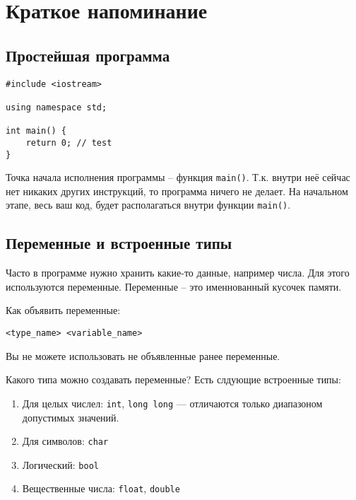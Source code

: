 \documentclass[10pt,a4paper]{article}
\begin{document}
\section*{Краткое напоминание}


\subsection*{Простейшая программа}

\begin{lstlisting}
#include <iostream>

using namespace std;

int main() {
    return 0; // test
}
\end{lstlisting}

Точка начала исполнения программы -- функция \lstinline|main()|. Т.к. внутри неё сейчас нет никаких других инструкций, то программа ничего не делает. На начальном этапе, весь ваш код, будет располагаться внутри функции \lstinline|main()|.

\subsection*{Переменные и встроенные типы}

Часто в программе нужно хранить какие-то данные, например числа.
Для этого используются переменные. Переменные -- это именнованный
кусочек памяти. 

Как объявить переменные:

\begin{lstlisting}
<type_name> <variable_name> 
\end{lstlisting}

Вы не можете использовать не объявленные ранее переменные.

Какого типа можно создавать переменные? Есть слдующие встроенные типы:

\begin{enumerate}
\item Для целых числел: \lstinline|int|, \lstinline|long long| --- отличаются только диапазоном допустимых значений.
\item Для символов: \lstinline|char|
\item Логический: \lstinline|bool|
\item Вещественные числа: \lstinline|float|, \lstinline|double|
\end{enumerate}
\end{document}
